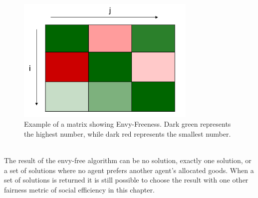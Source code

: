 \documentclass[german, a4paper, 11pt, oneside]{scrbook}
\begin{document}
\begin{figure}[h]
\centering
\includegraphics[height=6cm]{envy_matrix}
\caption{Example of a matrix showing Envy-Freeness. Dark green represents the highest number, while dark red represents the smallest number.}
\end{figure}
\\
The result of the envy-free algorithm can be no solution,  exactly one solution, or a set of solutions where no agent prefers another agent's allocated goods. When a set of solutions is returned it is still possible to choose the result with one other fairness metric of social efficiency in this chapter.
\end{document}
